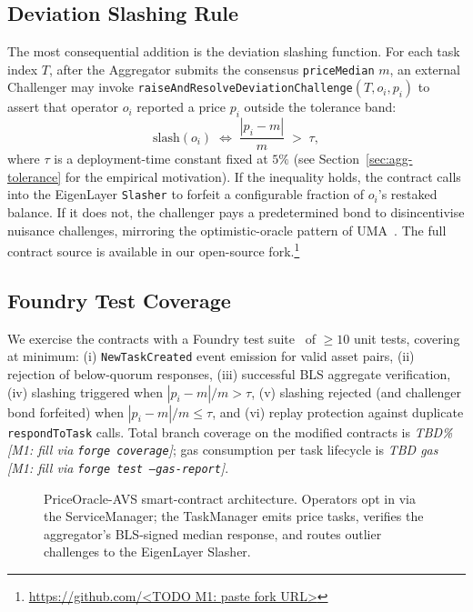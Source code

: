 \subsection{Deviation Slashing Rule}

The most consequential addition is the deviation slashing function.
For each task index $T$, after the Aggregator submits the consensus
\texttt{priceMedian} $m$, an external Challenger may invoke
\texttt{raiseAndResolveDeviationChallenge}$(T, o_i, p_i)$ to assert
that operator $o_i$ reported a price $p_i$ outside the tolerance band:
\begin{equation}
\text{slash}(o_i) \;\iff\; \frac{|p_i - m|}{m} \;>\; \tau,
\label{eq:slash}
\end{equation}
where $\tau$ is a deployment-time constant fixed at $5\%$
(see Section~\ref{sec:agg-tolerance} for the empirical motivation).
If the inequality holds, the contract calls into the EigenLayer
\texttt{Slasher} to forfeit a configurable fraction of $o_i$'s
restaked balance.  If it does not, the challenger pays a
predetermined bond to disincentivise nuisance challenges, mirroring
the optimistic-oracle pattern of UMA~\cite{uma2020}.  The full
contract source is available in our open-source
fork.\footnote{\url{https://github.com/<TODO M1: paste fork URL>}}

\subsection{Foundry Test Coverage}

We exercise the contracts with a Foundry test
suite~\cite{foundry} of $\geq 10$ unit tests, covering at minimum:
(i) \texttt{NewTaskCreated} event emission for valid asset pairs,
(ii) rejection of below-quorum responses,
(iii) successful BLS aggregate verification,
(iv) slashing triggered when $|p_i - m| / m > \tau$,
(v) slashing rejected (and challenger bond forfeited) when
$|p_i - m| / m \leq \tau$,
and (vi) replay protection against duplicate \texttt{respondToTask}
calls.  Total branch coverage on the modified contracts is
\textit{TBD\% [M1: fill via \texttt{forge coverage}]}; gas
consumption per task lifecycle is \textit{TBD gas [M1: fill via
\texttt{forge test --gas-report}]}.

\begin{figure}[t]
  \centering
  \caption{PriceOracle-AVS smart-contract architecture.  Operators
           opt in via the ServiceManager; the TaskManager emits price
           tasks, verifies the aggregator's BLS-signed median
           response, and routes outlier challenges to the EigenLayer
           Slasher.}
  \label{fig:contracts}
\end{figure}
